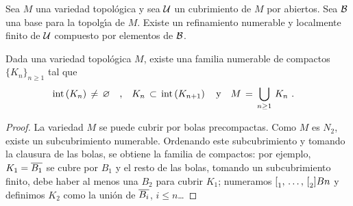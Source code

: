 \begin{teoRefinamiento}\label{thm:refinamiento}
	Sea $M$ una variedad topol\'{o}gica y sea $\cal U$ un cubrimiento de
	$M$ por abiertos. Sea $\cal B$ una base para la topolg\'{\i}a de $M$.
	Existe un refinamiento numerable y localmente finito de $\cal U$
	compuesto por elementos de $\cal B$.
\end{teoRefinamiento}

\begin{propoVariedadEsSigmaCompacta}\label{propo:variedadessigmacompacta}
	Dada una variedad topol\'{o}gica $M$, existe una familia numerable de
	compactos $\{K_n\}_{n\geq 1}$ tal que
	\begin{align*}
		\interior{K_n}\,\not=\,\varnothing & \quad\text{,}\quad
			K_n\,\subset\,\interior{K_{n+1}}
			\quad\text{y}\quad
			M \,=\,\bigcup_{n\geq 1}\,K_n
		\text{ .}
	\end{align*}
\end{propoVariedadEsSigmaCompacta}

\begin{proof}
	La variedad $M$ se puede cubrir por bolas precompactas. Como $M$ es
	$N_2$, existe un subcubrimiento numerable. Ordenando este
	subcubrimiento y tomando la clausura de las bolas, se obtiene la
	familia de compactos: por ejemplo, $K_1=\clos{B_1}$ se cubre por
	$B_1$ y el resto de las bolas, tomando un subcubrimiento finito, debe
	haber al menos una $B_2$ para cubrir $K_1$; numeramos $\lista[2]{B}{n}$
	y definimos $K_2$ como la uni\'{o}n de $\clos{B_i}$, $i\leq n$\dots
\end{proof}

